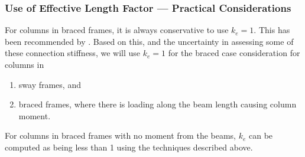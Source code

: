 \subsubsection{Use of Effective Length Factor --- Practical Considerations}
For columns in braced frames, it is always conservative to use $k_e=1$. This has been recommended by \citet{Yura1971}. Based on this, and the uncertainty in assessing some of these connection stiffness, we will use $k_e=1$ for the braced case consideration for columns in
\begin{enumerate}
\item sway frames, and
\item braced frames, where there is loading along the beam length causing column moment.
\end{enumerate}
For columns in braced frames with no moment from the beams, $k_e$ can be computed as being less than \num{1} using the techniques described above.

